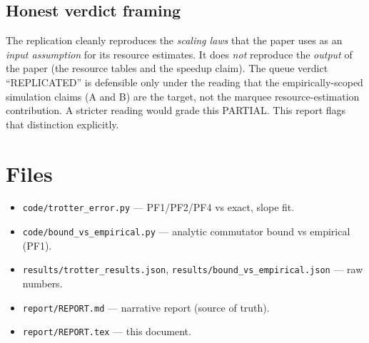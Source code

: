 \documentclass[11pt]{article}
\begin{document}
\subsection*{Honest verdict framing}
The replication cleanly reproduces the \emph{scaling laws} that the paper
uses as an \emph{input assumption} for its resource estimates. It does
\emph{not} reproduce the \emph{output} of the paper (the resource tables
and the speedup claim). The queue verdict ``REPLICATED'' is defensible
only under the reading that the empirically-scoped simulation claims
(A and B) are the target, not the marquee resource-estimation
contribution. A stricter reading would grade this PARTIAL. This report
flags that distinction explicitly.



\section{Files}
\begin{itemize}
  \item \texttt{code/trotter\_error.py} --- PF1/PF2/PF4 vs exact, slope fit.
  \item \texttt{code/bound\_vs\_empirical.py} --- analytic commutator bound vs empirical (PF1).
  \item \texttt{results/trotter\_results.json},
        \texttt{results/bound\_vs\_empirical.json} --- raw numbers.
  \item \texttt{report/REPORT.md} --- narrative report (source of truth).
  \item \texttt{report/REPORT.tex} --- this document.
\end{itemize}
\end{document}
